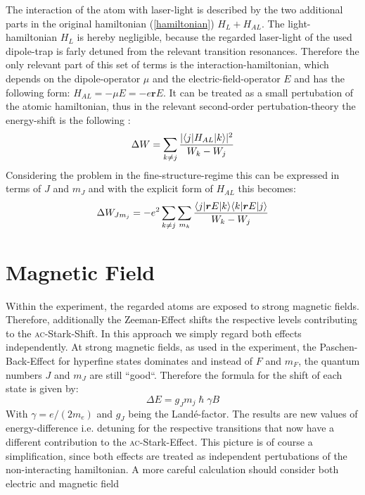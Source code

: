 The interaction of the atom with laser-light is described by the two additional parts in the original hamiltonian (\ref{hamiltonian}) $H_L+H_{AL}$. The light-hamiltonian $H_L$ is hereby negligible, because the regarded laser-light of the used dipole-trap is farly detuned from the relevant transition resonances. Therefore the only relevant part of this set of terms is the interaction-hamiltonian, which depends on the dipole-operator $\mu$ and the electric-field-operator $E$ and has the following form: $H_{AL}=-\mu E=-e\boldsymbol{r} E$. It can be treated as a small pertubation of the atomic hamiltonian, thus in the relevant second-order pertubation-theory the energy-shift is the following \cite{dipole}:
\begin{equation}
\Delta W=\sum_{k\neq j}\frac{|\langle j| H_{AL} | k\rangle|^2}{W_k-W_j}
\end{equation}
Considering the problem in the fine-structure-regime this can be expressed in terms of $J$ and $m_J$ and with the explicit form of $H_{AL}$ this becomes\cite{alpha}:
\begin{equation}
\Delta W_{Jm_j}=-e^2\sum_{k\neq j}\sum_{m_k}\frac{\langle j| \boldsymbol{r}E | k\rangle\langle k| \boldsymbol{r}E | j\rangle}{W_k-W_j}
\end{equation}
\section{Magnetic Field}

Within the experiment, the regarded atoms are exposed to strong magnetic fields. Therefore, additionally the Zeeman-Effect shifts the respective levels contributing to the \textsc{ac}-Stark-Shift. In this approach we simply regard both effects independently. At strong magnetic fields, as used in the experiment, the Paschen-Back-Effect for hyperfine states dominates and instead of $F$ and $m_F$, the quantum numbers $J$ and $m_J$ are still “good“. Therefore the formula for the shift of each state is given by:
\begin{equation}
\Delta E=g_Jm_j\hslash\gamma B
\end{equation}
With $\gamma=e/(2m_e)$ and $g_J$ being the Landé-factor. The results are new values of energy-difference i.e. detuning for the respective transitions that now have a different contribution to the \textsc{ac}-Stark-Effect. This picture is of course a simplification, since both effects are treated as independent pertubations of the non-interacting hamiltonian. A more careful calculation should consider both electric and magnetic field 